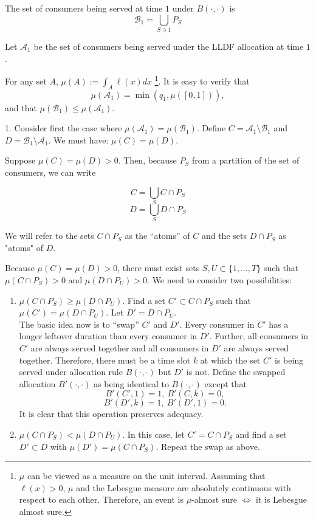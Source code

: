 \documentclass[10pt,draftcls,onecolumn]{IEEEtran}
\newcounter{l1}
\newcounter{l2}
\newcounter{l3}
\begin{document}
The set of consumers being served at time $1$ under $B(\cdot,\cdot)$ is
\[ \mathcal{B}_1 = \bigcup_{S \ni 1} P_S \]

Let $\mathcal{A}_1$ be the set of consumers being served under the LLDF allocation at time $1$.

For any  set $A$, $\mu(A) := \int_{A} \ell(x)dx$ \footnote{$\mu$ can be viewed as a measure on the unit interval. Assuming that $\ell(x)>0$, $\mu$ and the Lebesgue measure are absolutely continuous with respect to each other. Therefore,  an event is $\mu$-almost sure $\iff$ it is Lebesgue almost sure.}. It is easy to verify that 
\begin{equation}
\mu(\mathcal{A}_1) = \min(q_1, \mu([0,1])),
\end{equation}
and that $\mu(\mathcal{B}_1) \leq \mu(\mathcal{A}_1)$.


1. Consider first the case where  $\mu(\mathcal{A}_1) = \mu(\mathcal{B}_1)$. 
Define $C = \mathcal{A}_1\setminus \mathcal{B}_1$ and $D = \mathcal{B}_1\setminus\mathcal{A}_1$.
We must have:
$\mu(C) = \mu(D)$.

Suppose $\mu(C)= \mu(D) >0$. Then, because $P_S$ from a partition of the set of consumers, we can write

\[ C = \bigcup_{S} C \cap P_S \]
\[ D= \bigcup_S D \cap P_S\]

We will refer to the sets $C \cap P_S$ as the ``atoms'' of $C$ and the sets $D \cap P_S$ as "atoms" of $D$.

Because $\mu(C)  = \mu(D) >0$, there must exist sets $S,U \subset \{1,\ldots,T\}$ such that $\mu(C \cap P_S) >0$ and $\mu(D \cap P_U) >0$. 
We need to consider two possibilities:

\begin{enumerate}
\item $\mu(C \cap P_S) \geq \mu(D \cap P_U)$. Find a set $C' \subset C \cap P_S$ such that $\mu(C') = \mu(D \cap P_U)$. Let $D' =D \cap P_U $.
~\\

The basic idea now is to ``swap'' $C'$ and $D'$. 
Every consumer in $C'$ has a longer leftover duration than every consumer in $D'$. Further, all consumers in $C'$ are always served together and all consumers in $D'$ are always served together.  Therefore, there must be a time slot $k$ at which the set $C'$ is being served under allocation rule $B(\cdot,\cdot)$ but $D'$ is not.  
Define the swapped allocation $B'(\cdot,\cdot)$ as being identical to $B(\cdot,\cdot)$ except that 
\[ B'(C',1) =1, ~ B'(C,k) =0,\]
 \[B'(D',k) =1, ~ B'(D',1) =0.\]
It is clear that this operation preserves adequacy.
\item $\mu(C \cap P_S) < \mu(D \cap P_U)$. In this case, let $C' = C \cap P_S$ and find a set $D' \subset D$ with $\mu(D') = \mu(C \cap P_S)$. Repeat the swap as above.

\end{enumerate}
\end{document}
